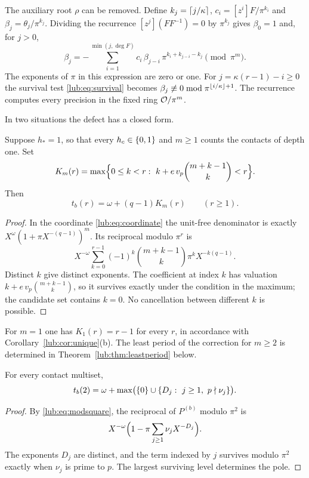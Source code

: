 \begin{remark}\label{lub:rem:original}
The auxiliary root $\rho$ can be removed. Define $k_j=\lceil j/\kappa\rceil$,
$c_i=[z^i]F/\pi^{k_i}$ and $\beta_j=\theta_j/\pi^{k_j}$. Dividing the recurrence
$[z^j](FF^{-1})=0$ by $\pi^{k_j}$ gives $\beta_0=1$ and, for $j>0$,
\[
 \beta_j=-\sum_{i=1}^{\min(j,\deg F)}c_i\,\beta_{j-i}\,\pi^{k_i+k_{j-i}-k_j}\pmod{\pi^m}.
\]
The exponents of $\pi$ in this expression are zero or one. For $j=\kappa(r-1)-i\ge0$ the
survival test \eqref{lub:eq:survival} becomes
$\beta_j\not\equiv0\bmod\pi^{\lfloor i/\kappa\rfloor+1}$. The recurrence computes every precision
in the fixed ring $\mathcal{O}/\pi^m$.
\end{remark}

In two situations the defect has a closed form.

\begin{proposition}\label{lub:prop:depthone}
Suppose $h_*=1$, so that every $h_c\in\{0,1\}$ and $m\ge1$ counts the contacts of depth
one. Set
\[
 K_m(r)=\max\Bigl\{0\le k<r:\ k+e\,v_p\binom{m+k-1}{k}<r\Bigr\}.
\]
Then
\begin{equation}\label{lub:eq:depthone}
 t_b(r)=\omega+(q-1)K_m(r)\qquad(r\ge1).
\end{equation}
\end{proposition}
\begin{proof}
In the coordinate \eqref{lub:eq:coordinate} the unit-free denominator is exactly
$X^{\omega}(1+\pi X^{-(q-1)})^m$. Its reciprocal modulo $\pi^r$ is
\[
 X^{-\omega}\sum_{k=0}^{r-1}(-1)^k\binom{m+k-1}{k}\pi^kX^{-k(q-1)} .
\]
Distinct $k$ give distinct exponents. The coefficient at index $k$ has valuation
$k+e\,v_p\binom{m+k-1}{k}$, so it survives exactly under the condition in the maximum; the
candidate set contains $k=0$. No cancellation between different $k$ is possible.
\end{proof}

For $m=1$ one has $K_1(r)=r-1$ for every $r$, in accordance with
Corollary~\ref{lub:cor:unique}(b). The least period of the correction for $m\ge2$ is
determined in Theorem~\ref{lub:thm:leastperiod} below.

\begin{proposition}\label{lub:prop:second}
For every contact multiset,
\[
 t_b(2)=\omega+\max\bigl(\set{0}\cup\set{D_j:\ j\ge1,\ p\nmid\nu_j}\bigr).
\]
\end{proposition}
\begin{proof}
By \eqref{lub:eq:modsquare}, the reciprocal of $P^{(b)}$ modulo $\pi^2$ is
\[
 X^{-\omega}\Bigl(1-\pi\sum_{j\ge1}\nu_jX^{-D_j}\Bigr).
\]
The exponents $D_j$ are distinct, and the term indexed by $j$ survives modulo $\pi^2$
exactly when $\nu_j$ is prime to $p$. The largest surviving level determines the pole.
\end{proof}


